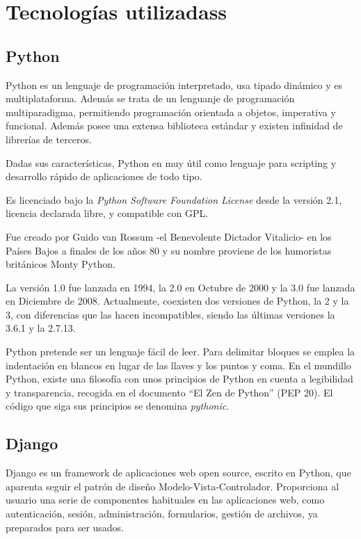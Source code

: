 \section{Tecnologías utilizadass} 
\label{sec:tec_use}

\subsection{Python} 
\label{sec:python}


Python es un lenguaje de programación interpretado, usa tipado dinámico y es multiplataforma. Además se trata de un lenguanje de programación multiparadigma, permitiendo programación orientada a objetos, imperativa y funcional. Además posee una extensa biblioteca estándar y existen infinidad de librerías de terceros.


Dadas sus características, Python en muy útil como lenguaje para scripting y desarrollo rápido de aplicaciones de todo tipo.


Es licenciado bajo la \textit{Python Software Foundation License} desde la versión 2.1, licencia declarada libre, y compatible con GPL.


Fue creado por Guido van Rossum -el Benevolente Dictador Vitalicio- en los Países Bajos a finales de los años 80 y su nombre proviene de los humoristas británicos Monty Python.


La versión 1.0 fue lanzada en 1994, la 2.0 en Octubre de 2000 y la 3.0 fue lanzada en Diciembre de 2008. Actualmente, coexisten dos versiones de Python, la 2 y la 3, con diferencias que las hacen incompatibles, siendo las últimas versiones la 3.6.1 y la 2.7.13.


Python pretende ser un lenguaje fácil de leer. Para delimitar bloques se emplea la indentación en blancos en lugar de las llaves y los puntos y coma. En el mundillo Python, existe una filosofía  con unos principios de Python en cuenta a legibilidad y transparencia, recogida en el documento ``El Zen de Python'' (PEP 20). El código que siga sus principios se denomina \textit{pythonic}.


\subsection{Django} 
\label{sec:django}


Django es un framework de aplicaciones web open source, escrito en Python, que aparenta seguir el patrón de diseño Modelo-Vista-Controlador. Proporciona al usuario una serie de componentes habituales en las aplicaciones web, como autenticación, sesión, administración, formularios, gestión de archivos, ya preparados para ser usados.


